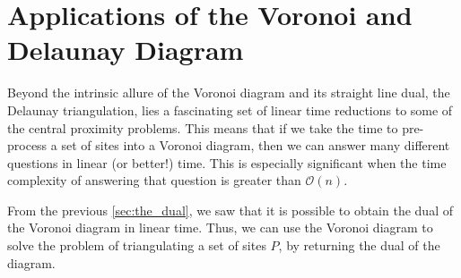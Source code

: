 \documentclass[12pt,twoside]{reedthesis}
\begin{document}
    



  \section{Applications of the Voronoi and Delaunay Diagram} %
  \label{sec:applications_of_voronoi_and_delaunay_diagrams}
    Beyond the intrinsic allure of the Voronoi diagram and its straight line dual, the Delaunay triangulation, lies a fascinating set of linear time reductions to some of the central proximity problems. This means that if we take the time to pre-process a set of sites into a Voronoi diagram, then we can answer many different questions in linear (or better!) time. This is especially significant when the time complexity of answering that question is greater than $\mathcal{O}(n)$.\par 

    From the previous \cref{sec:the_dual}, we saw that it is possible to obtain the dual of the Voronoi diagram in linear time. Thus, we can use the Voronoi diagram to solve the problem of triangulating a set of sites $P$, by returning the dual of the diagram. 
\end{document}
